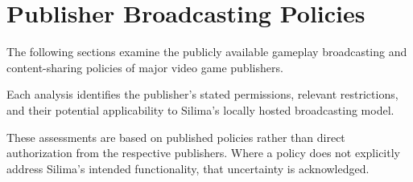 \section{Publisher Broadcasting Policies}

The following sections examine the publicly available
gameplay broadcasting and content-sharing policies of
major video game publishers.

Each analysis identifies the publisher's stated permissions,
relevant restrictions, and their potential applicability
to Silima's locally hosted broadcasting model.

These assessments are based on published policies rather
than direct authorization from the respective publishers.
Where a policy does not explicitly address Silima's
intended functionality, that uncertainty is acknowledged.




